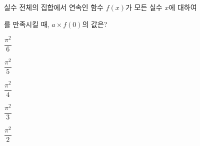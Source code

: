 실수 전체의 집합에서 연속인 함수 $f(x)$가 모든 실수 $x$에 대하여 \par\smallskip{}\par\smallskip\noindent 를 만족시킬 때, $a\times f(0)$의 값은? 
\begin{choices32}{\rule[-3ex]{0pt}{8ex}$\dfrac{\pi^2}{6}$}{\rule[-3ex]{0pt}{8ex}$\dfrac{\pi^2}{5}$}{\rule[-3ex]{0pt}{8ex}$\dfrac{\pi^2}{4}$}{\rule[-3ex]{0pt}{8ex}$\dfrac{\pi^2}{3}$}{\rule[-3ex]{0pt}{8ex}$\dfrac{\pi^2}{2}$}\end{choices32}
